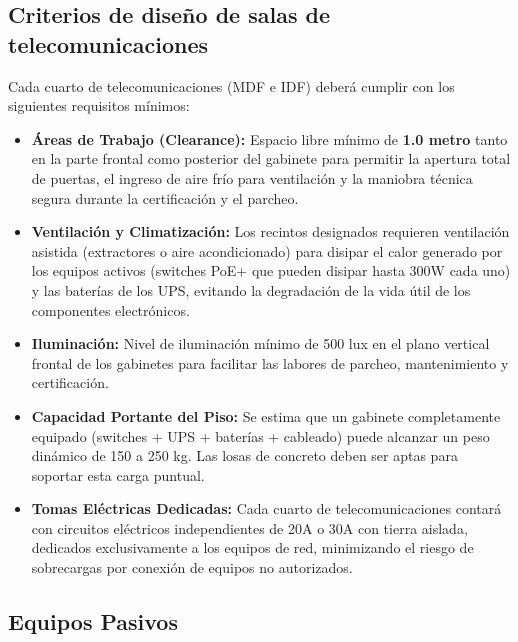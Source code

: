 \subsection*{Criterios de diseño de salas de telecomunicaciones}

Cada cuarto de telecomunicaciones (MDF e IDF) deberá cumplir con los siguientes requisitos mínimos:

\begin{itemize}
    \item \textbf{Áreas de Trabajo (Clearance):} Espacio libre mínimo de \textbf{1.0 metro} tanto en la parte frontal como posterior del gabinete para permitir la apertura total de puertas, el ingreso de aire frío para ventilación y la maniobra técnica segura durante la certificación y el parcheo.
    \item \textbf{Ventilación y Climatización:} Los recintos designados requieren ventilación asistida (extractores o aire acondicionado) para disipar el calor generado por los equipos activos (switches PoE+ que pueden disipar hasta 300W cada uno) y las baterías de los UPS, evitando la degradación de la vida útil de los componentes electrónicos.
    \item \textbf{Iluminación:} Nivel de iluminación mínimo de 500 lux en el plano vertical frontal de los gabinetes para facilitar las labores de parcheo, mantenimiento y certificación.
    \item \textbf{Capacidad Portante del Piso:} Se estima que un gabinete completamente equipado (switches + UPS + baterías + cableado) puede alcanzar un peso dinámico de 150 a 250 kg. Las losas de concreto deben ser aptas para soportar esta carga puntual.
    \item \textbf{Tomas Eléctricas Dedicadas:} Cada cuarto de telecomunicaciones contará con circuitos eléctricos independientes de 20A o 30A con tierra aislada, dedicados exclusivamente a los equipos de red, minimizando el riesgo de sobrecargas por conexión de equipos no autorizados.
\end{itemize}

\subsection*{Equipos Pasivos}

